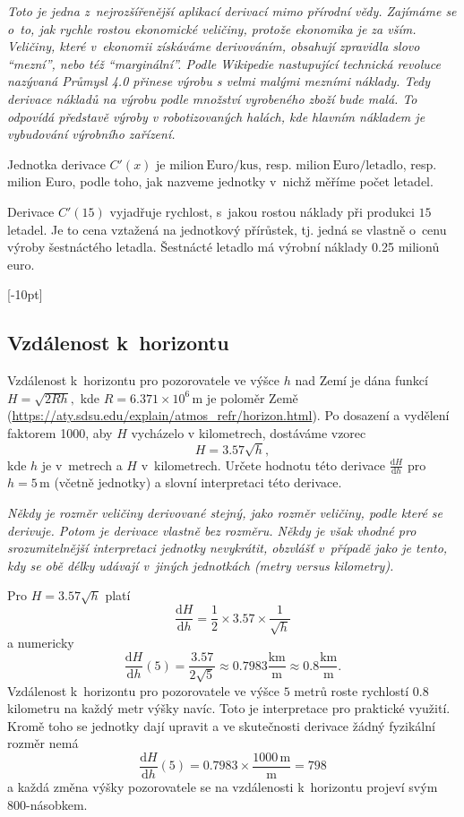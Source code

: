 \textit{Toto je jedna z nejrozšířenější aplikací derivací mimo přírodní vědy. Zajímáme se o to, jak rychle rostou ekonomické veličiny, protože ekonomika je za vším. Veličiny, které v ekonomii získáváme derivováním, obsahují zpravidla slovo ``mezní'', nebo též ``marginální''. Podle Wikipedie nastupující technická revoluce nazývaná Průmysl 4.0 přinese výrobu s velmi malými mezními náklady. Tedy derivace nákladů na výrobu podle množství vyrobeného zboží bude malá. To odpovídá představě výroby v robotizovaných halách, kde hlavním nákladem je vybudování výrobního zařízení.}

\reseni
Jednotka derivace $C'(x)$ je $\mathrm{milion\ Euro}/\mathrm{kus}$, resp. 
$\mathrm{milion\ Euro}/\mathrm{letadlo}$, resp. milion Euro, podle toho, jak nazveme jednotky v nichž měříme počet letadel.

Derivace $C'(15)$ vyjadřuje rychlost, s jakou rostou náklady při produkci $15$ letadel. Je to cena vztažená na jednotkový přírůstek, tj. jedná se vlastně o cenu výroby šestnáctého letadla. Šestnácté letadlo má výrobní náklady 0.25 milionů euro. 

\konec



[-10pt]
\subsection{Vzdálenost k horizontu}
Vzdálenost k horizontu pro pozorovatele ve výšce $h$ nad Zemí je dána funkcí $H=\sqrt {2Rh},$ kde $R=6.371\times 10^6\,\mathrm m$ je poloměr Země (\url{https://aty.sdsu.edu/explain/atmos_refr/horizon.html}). Po dosazení a vydělení faktorem 1000, aby $H$ vycházelo v kilometrech, dostáváme vzorec $$H=3.57\sqrt{h},$$ kde $h$ je v metrech a $H$ v kilometrech. Určete hodnotu této derivace $\frac{\mathrm d H}{\mathrm dh}$ pro $h=5\,\mathrm{m}$ (včetně jednotky) a slovní interpretaci této derivace.

\textit{Někdy je rozměr veličiny derivované stejný, jako rozměr veličiny, podle které se derivuje. Potom je derivace vlastně bez rozměru. Někdy je však vhodné pro srozumitelnější interpretaci jednotky nevykrátit, obzvlášť v případě jako je tento, kdy se obě délky udávají v jiných jednotkách (metry versus kilometry). }

\reseni
Pro $H=3.57\sqrt h$ platí $$\frac{\mathrm dH}{\mathrm dh}=\frac 12 \times 3.57 \times \frac {1}{\sqrt h}$$ a numericky
$$\frac{\mathrm dH}{\mathrm dh}(5)=\frac{3.57}{2\sqrt 5}\approx 0.7983 \frac {\mathrm{km}}{\mathrm m}\approx 0.8 \frac {\mathrm{km}}{\mathrm m}.$$ Vzdálenost k horizontu pro pozorovatele ve výšce $5$ metrů roste rychlostí 0.8 kilometru na každý metr výšky navíc. Toto je interpretace pro praktické využití. Kromě toho se jednotky dají upravit a ve skutečnosti derivace žádný fyzikální rozměr nemá
$$\frac{\mathrm dH}{\mathrm dh}(5)=0.7983 \times \frac {1000\, \mathrm{m}}{\mathrm m}=798$$ a každá změna výšky pozorovatele se na vzdálenosti k horizontu projeví svým $800$-násobkem.
\konec




